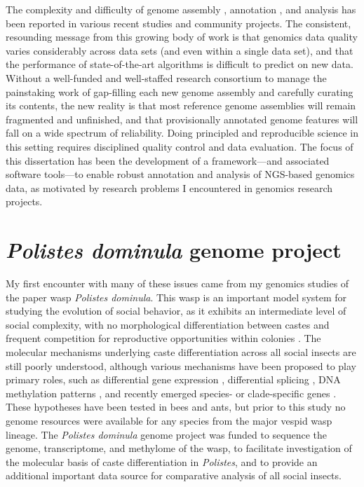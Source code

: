 The complexity and difficulty of genome assembly \cite{Assemblathon1,Assemblathon2,GAGE,QUAST}, annotation \cite{EGASP,AED,DentonFly}, and analysis \cite{PigWatson,RnaSeqTrim,RnaSeqTrim2} has been reported in various recent studies and community projects.
The consistent, resounding message from this growing body of work is that genomics data quality varies considerably across data sets (and even within a single data set), and that the performance of state-of-the-art algorithms is difficult to predict on new data.
Without a well-funded and well-staffed research consortium to manage the painstaking work of gap-filling each new genome assembly and carefully curating its contents, the new reality is that most reference genome assemblies will remain fragmented and unfinished, and that provisionally annotated genome features will fall on a wide spectrum of reliability.
Doing principled and reproducible science in this setting requires disciplined quality control and data evaluation.
The focus of this dissertation has been the development of a framework---and associated software tools---to enable robust annotation and analysis of NGS-based genomics data, as motivated by research problems I encountered in genomics research projects.

\section{\textit{Polistes dominula} genome project}

My first encounter with many of these issues came from my genomics studies of the paper wasp \textit{Polistes dominula}.
This wasp is an important model system for studying the evolution of social behavior, as it exhibits an intermediate level of social complexity, with no morphological differentiation between castes and frequent competition for reproductive opportunities within colonies \cite{JandtToth}.
The molecular mechanisms underlying caste differentiation across all social insects are still poorly understood, although various mechanisms have been proposed to play primary roles, such as differential gene expression \cite{ChenDiffExp,GrozingerDiffExp,WhitfieldDiffExp,OmettoDiffExp,SimolaDiffExp,HarrisonDiffExp,PcanTrans}, differential splicing \cite{Dnmt3KD}, DNA methylation patterns \cite{Dnmt3KD,Lyko2011}, and recently emerged species- or clade-specific genes \cite{SumnerTRG,JohnsonTRG}.
These hypotheses have been tested in bees and ants, but prior to this study no genome resources were available for any species from the major vespid wasp lineage.
The \textit{Polistes dominula} genome project was funded to sequence the genome, transcriptome, and methylome of the wasp, to facilitate investigation of the molecular basis of caste differentiation in \textit{Polistes}, and to provide an additional important data source for comparative analysis of all social insects.

